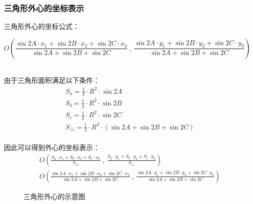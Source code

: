 \documentclass[UTF8]{ctexart}
\begin{document}
\newpage

\subsubsection{三角形外心的坐标表示}
    三角形外心的坐标公式：\vspace{5pt}
    \begin{large}
        \begin{equation*}
            O\left(\frac{\sin{2A}\cdot x_1+\sin{2B}\cdot x_2+\sin{2C}\cdot x_3}{\sin{2A}+\sin{2B}+\sin{2C}}~,~\frac{\sin{2A}\cdot y_1+\sin{2B}\cdot y_2+\sin{2C}\cdot y_3}{\sin{2A}+\sin{2B}+\sin{2C}}\right)
        \end{equation*}
    \end{large}\\
    由于三角形面积满足以下条件：
    \begin{align}
        &S_a=\frac{1}{2}\cdot R^2\cdot\sin{2A}\\[3mm]
        &S_b=\frac{1}{2}\cdot R^2\cdot\sin{2B}\\[3mm]
        &S_c=\frac{1}{2}\cdot R^2\cdot\sin{2C}\\[3mm]
        &S_{\triangle}=\frac{1}{2}\cdot R^2\cdot(\sin{2A}+\sin{2B}+\sin{2C})
    \end{align}\\
    因此可以得到外心的坐标表示：\vspace{5pt}
    \begin{align}
        &O\left(\frac{S_a\cdot x_1+S_b\cdot x_2+S_c\cdot x_3}{S_\triangle}~,~\frac{S_a\cdot y_1+S_b\cdot y_2+S_c\cdot y_3}{S_\triangle}\right)\\[3mm]
        &O\left(\frac{\sin{2A}\cdot x_1+\sin{2B}\cdot x_2+\sin{2C}\cdot x_3}{\sin{2A}+\sin{2B}+\sin{2C}}~,~\frac{\sin{2A}\cdot y_1+\sin{2B}\cdot y_2+\sin{2C}\cdot y_3}{\sin{2A}+\sin{2B}+\sin{2C}}\right)
    \end{align}
    \begin{figure}[htbp]
        \begin{center}
            \caption{三角形外心的示意图}
        \end{center}
    \end{figure}
\end{document}
